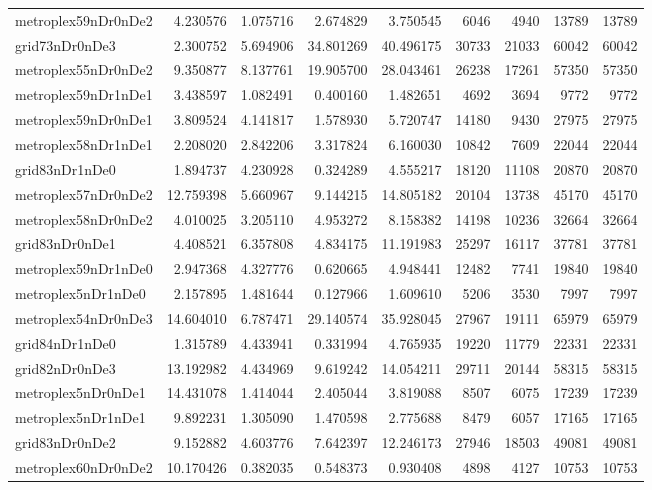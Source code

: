 \begin{longtable}{|l|r|r|r|r|r|r|r|r|}
metroplex59nDr0nDe2 & 4.230576 & 1.075716 & 2.674829 & 3.750545 & 6046 & 4940 & 13789 & 13789 \\
grid73nDr0nDe3 & 2.300752 & 5.694906 & 34.801269 & 40.496175 & 30733 & 21033 & 60042 & 60042 \\
metroplex55nDr0nDe2 & 9.350877 & 8.137761 & 19.905700 & 28.043461 & 26238 & 17261 & 57350 & 57350 \\
metroplex59nDr1nDe1 & 3.438597 & 1.082491 & 0.400160 & 1.482651 & 4692 & 3694 & 9772 & 9772 \\
metroplex59nDr0nDe1 & 3.809524 & 4.141817 & 1.578930 & 5.720747 & 14180 & 9430 & 27975 & 27975 \\
metroplex58nDr1nDe1 & 2.208020 & 2.842206 & 3.317824 & 6.160030 & 10842 & 7609 & 22044 & 22044 \\
grid83nDr1nDe0 & 1.894737 & 4.230928 & 0.324289 & 4.555217 & 18120 & 11108 & 20870 & 20870 \\
metroplex57nDr0nDe2 & 12.759398 & 5.660967 & 9.144215 & 14.805182 & 20104 & 13738 & 45170 & 45170 \\
metroplex58nDr0nDe2 & 4.010025 & 3.205110 & 4.953272 & 8.158382 & 14198 & 10236 & 32664 & 32664 \\
grid83nDr0nDe1 & 4.408521 & 6.357808 & 4.834175 & 11.191983 & 25297 & 16117 & 37781 & 37781 \\
metroplex59nDr1nDe0 & 2.947368 & 4.327776 & 0.620665 & 4.948441 & 12482 & 7741 & 19840 & 19840 \\
metroplex5nDr1nDe0 & 2.157895 & 1.481644 & 0.127966 & 1.609610 & 5206 & 3530 & 7997 & 7997 \\
metroplex54nDr0nDe3 & 14.604010 & 6.787471 & 29.140574 & 35.928045 & 27967 & 19111 & 65979 & 65979 \\
grid84nDr1nDe0 & 1.315789 & 4.433941 & 0.331994 & 4.765935 & 19220 & 11779 & 22331 & 22331 \\
grid82nDr0nDe3 & 13.192982 & 4.434969 & 9.619242 & 14.054211 & 29711 & 20144 & 58315 & 58315 \\
metroplex5nDr0nDe1 & 14.431078 & 1.414044 & 2.405044 & 3.819088 & 8507 & 6075 & 17239 & 17239 \\
metroplex5nDr1nDe1 & 9.892231 & 1.305090 & 1.470598 & 2.775688 & 8479 & 6057 & 17165 & 17165 \\
grid83nDr0nDe2 & 9.152882 & 4.603776 & 7.642397 & 12.246173 & 27946 & 18503 & 49081 & 49081 \\
metroplex60nDr0nDe2 & 10.170426 & 0.382035 & 0.548373 & 0.930408 & 4898 & 4127 & 10753 & 10753 \\

\end{longtable}
